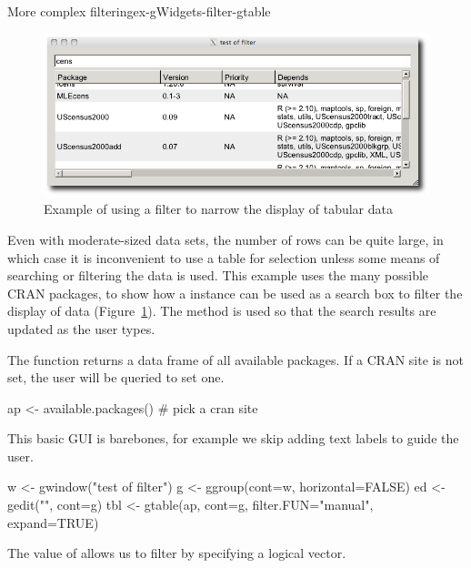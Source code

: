 \begin{example}{More complex filtering}{ex-gWidgets-filter-gtable}

\begin{figure}
  \centering
  \includegraphics[width=.8\textwidth]{fig-gWidgets-filter-example}
  \caption{Example of using a filter to narrow the display of tabular data}
  \label{fig:gWidgets-filter-example}
\end{figure}

Even with moderate-sized data sets, the number of rows can be quite large, in which case it is
inconvenient to use a table for selection unless some means of searching or filtering the
data is used. This example uses the many possible CRAN packages, to show how a
 instance can be used as a search box to filter the display of
data (Figure~\ref{fig:gWidgets-filter-example}). The  method is used so that the search
results are updated as the user types.


The  function returns a data frame of all
available packages. If a CRAN site is not set, the user will be
queried to set one.
\begin{Schunk}
\begin{Sinput}
 ap <- available.packages()       # pick a cran site
\end{Sinput}
\end{Schunk}

This basic GUI is barebones, for example we skip adding text labels to guide the user. 
\begin{Schunk}
\begin{Sinput}
 w <- gwindow("test of filter")
 g <- ggroup(cont=w, horizontal=FALSE)
 ed <- gedit("", cont=g)
 tbl <- gtable(ap, cont=g, filter.FUN="manual", expand=TRUE)
\end{Sinput}
\end{Schunk}
The  value of  allows us to
filter by specifying a logical vector.


\end{example}
